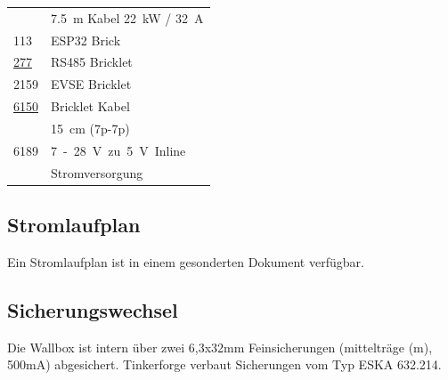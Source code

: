 \documentclass[a4paper,10pt]{article}
\begin{document}
\begin{multicols*}{2}
\begin{tabular}{ll}
		                                                                                                                         & \SI{7,5}{\meter} Kabel \SI{22}{\kilo\watt} / \SI{32}{\ampere} \\
		\cmidrule(lr{0.5em}){1-2}
		113                                                                                                                      & ESP32 Brick                                                   \\
		\cmidrule(lr{0.5em}){1-2}
		\href{https://www.tinkerforge.com/de/shop/bricklets/rs485-bricklet.html}{277}                                            & RS485 Bricklet                                                \\
		\cmidrule(lr{0.5em}){1-2}
		2159                                                                                                                     & EVSE Bricklet                                                 \\
		\cmidrule(lr{0.5em}){1-2}
		\href{https://www.tinkerforge.com/de/shop/accessories/cable/bricklet-cable-15cm-7p-7p.html}{6150}                        & Bricklet Kabel                                                \\
		                                                                                                                         & \SI{15}{\centi\meter} (7p-7p)                                 \\
		\cmidrule(lr{0.5em}){1-2}
		6189                                                                                                                     & \SI{7} - \SI{28}{\volt} zu \SI{5}{\volt} Inline               \\
		                                                                                                                         & Stromversorgung                                               \\
	\end{tabular}

	\subsection{Stromlaufplan}
	Ein Stromlaufplan ist in einem gesonderten Dokument verfügbar.

	\subsection{Sicherungswechsel}
	Die Wallbox ist intern über zwei 6,3x32mm Feinsicherungen (mittelträge (m), 500mA) abgesichert.
	Tinkerforge verbaut Sicherungen vom Typ \glqq ESKA  632.214\grqq.


\end{multicols*}
\end{document}
